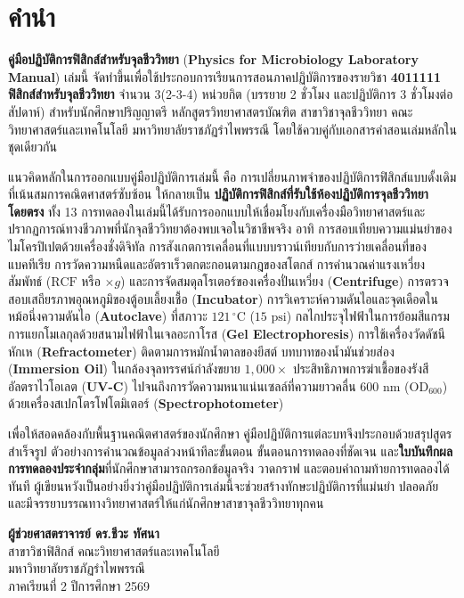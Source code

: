 \chapter*{คำนำ}

\textbf{คู่มือปฏิบัติการฟิสิกส์สำหรับจุลชีววิทยา} (\textbf{Physics for Microbiology Laboratory Manual}) เล่มนี้ จัดทำขึ้นเพื่อใช้ประกอบการเรียนการสอนภาคปฏิบัติการของรายวิชา \textbf{4011111 ฟิสิกส์สำหรับจุลชีววิทยา} จำนวน 3(2-3-4) หน่วยกิต (บรรยาย 2 ชั่วโมง และปฏิบัติการ 3 ชั่วโมงต่อสัปดาห์) สำหรับนักศึกษาปริญญาตรี หลักสูตรวิทยาศาสตรบัณฑิต สาขาวิชาจุลชีววิทยา คณะวิทยาศาสตร์และเทคโนโลยี มหาวิทยาลัยราชภัฏรำไพพรรณี โดยใช้ควบคู่กับเอกสารคำสอนเล่มหลักในชุดเดียวกัน

แนวคิดหลักในการออกแบบคู่มือปฏิบัติการเล่มนี้ คือ การเปลี่ยนภาพจำของปฏิบัติการฟิสิกส์แบบดั้งเดิมที่เน้นสมการคณิตศาสตร์ซับซ้อน ให้กลายเป็น \textbf{ปฏิบัติการฟิสิกส์ที่รับใช้ห้องปฏิบัติการจุลชีววิทยาโดยตรง} ทั้ง 13 การทดลองในเล่มนี้ได้รับการออกแบบให้เชื่อมโยงกับเครื่องมือวิทยาศาสตร์และปรากฏการณ์ทางชีวภาพที่นักจุลชีววิทยาต้องพบเจอในวิชาชีพจริง อาทิ การสอบเทียบความแม่นยำของไมโครปิเปตด้วยเครื่องชั่งดิจิทัล การสังเกตการเคลื่อนที่แบบบราวน์เทียบกับการว่ายเคลื่อนที่ของแบคทีเรีย การวัดความหนืดและอัตราเร็วตกตะกอนตามกฎของสโตกส์ การคำนวณค่าแรงเหวี่ยงสัมพัทธ์ ($\text{RCF}$ หรือ $\times g$) และการจัดสมดุลโรเตอร์ของเครื่องปั่นเหวี่ยง (\textbf{Centrifuge}) การตรวจสอบเสถียรภาพอุณหภูมิของตู้อบเลี้ยงเชื้อ (\textbf{Incubator}) การวิเคราะห์ความดันไอและจุดเดือดในหม้อนึ่งความดันไอ (\textbf{Autoclave}) ที่สภาวะ $121\,^\circ\text{C}$ ($15\text{ psi}$) กลไกประจุไฟฟ้าในการย้อมสีแกรม การแยกโมเลกุลด้วยสนามไฟฟ้าในเจลอะกาโรส (\textbf{Gel Electrophoresis}) การใช้เครื่องวัดดัชนีหักเห (\textbf{Refractometer}) ติดตามการหมักน้ำตาลของยีสต์ บทบาทของน้ำมันช่วยส่อง (\textbf{Immersion Oil}) ในกล้องจุลทรรศน์กำลังขยาย $1{,}000\times$ ประสิทธิภาพการฆ่าเชื้อของรังสีอัลตราไวโอเลต (\textbf{UV-C}) ไปจนถึงการวัดความหนาแน่นเซลล์ที่ความยาวคลื่น $600\text{ nm}$ ($\text{OD}_{600}$) ด้วยเครื่องสเปกโตรโฟโตมิเตอร์ (\textbf{Spectrophotometer})

เพื่อให้สอดคล้องกับพื้นฐานคณิตศาสตร์ของนักศึกษา คู่มือปฏิบัติการแต่ละบทจึงประกอบด้วยสรุปสูตรสำเร็จรูป ตัวอย่างการคำนวณข้อมูลล่วงหน้าทีละขั้นตอน ขั้นตอนการทดลองที่ชัดเจน และ\textbf{ใบบันทึกผลการทดลองประจำกลุ่ม}ที่นักศึกษาสามารถกรอกข้อมูลจริง วาดกราฟ และตอบคำถามท้ายการทดลองได้ทันที ผู้เขียนหวังเป็นอย่างยิ่งว่าคู่มือปฏิบัติการเล่มนี้จะช่วยสร้างทักษะปฏิบัติการที่แม่นยำ ปลอดภัย และมีจรรยาบรรณทางวิทยาศาสตร์ให้แก่นักศึกษาสาขาจุลชีววิทยาทุกคน

\vspace{1.0cm}
\begin{flushright}
    \textbf{ผู้ช่วยศาสตราจารย์ ดร.ชีวะ ทัศนา}\\[0.2cm]
    สาขาวิชาฟิสิกส์ คณะวิทยาศาสตร์และเทคโนโลยี\\
    มหาวิทยาลัยราชภัฏรำไพพรรณี\\
    ภาคเรียนที่ 2 ปีการศึกษา 2569
\end{flushright}

